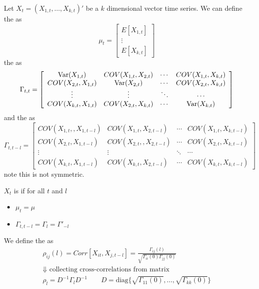 Let $X_t = (X_{1,t}, \ldots,X_{k,t})'$ be a $k$ dimensional vector time series.
We can define the  as
\begin{equation*}
    \mu_t = \left[\begin{array}{c}
        E[X_{1,t}]\\
        \vdots\\
        E[X_{k,t}]
    \end{array}\right]
\end{equation*}
the  as 
\begin{equation*}
    \Gamma_{t,t} = \left[\begin{array}{cccc}
        \operatorname{Var}(X_{1,t}) & COV(X_{1,t}, X_{2,t}) & \cdots & COV(X_{1,t}, X_{k,t})\\
        COV(X_{2,t}, X_{1,t}) & \operatorname{Var}(X_{2,t}) & \cdots & COV(X_{2,t}, X_{k,t})\\
        \vdots & \vdots & \ddots & \cdots\\
        COV(X_{k,t}, X_{1,t}) & COV(X_{2,t}, X_{k,t}) & \cdots & \operatorname{Var}(X_{k,t})
    \end{array}\right]
\end{equation*}
and the  as 
\begin{equation*}
    \Gamma_{t,t-l} = \left[\begin{array}{cccc}
        COV(X_{1,t},, X_{1,t-l}) & COV(X_{1,t}, X_{2,t-l}) & \cdots & COV(X_{1,t}, X_{k,t-l})\\
        COV(X_{2,t}, X_{1,t-l}) & COV(X_{2,t}, , X_{2,t-l}) & \cdots & COV(X_{2,t}, X_{k,t-l})\\
        \vdots & \vdots & \ddots & \cdots\\
        COV(X_{k,t}, X_{1,t-l}) & COV(X_{k,t}, X_{2,t-l}) & \cdots & COV(X_{k,t}, X_{k,t-l})
    \end{array}\right]
\end{equation*}
note this is not symmetric.
\begin{definition}
    $X_t$ is  if for all $t$ and $l$
    \begin{itemize}
        \item $\mu_t = \mu$
        \item $\Gamma_{t,t-l} = \Gamma_l = \Gamma'_{-l}$
    \end{itemize}
\end{definition}
We define the  as 
\begin{gather*}
    \rho_{ij}(l) = Corr[X_{it}, X_{j,t-l}] = \frac{\Gamma_{ij}(l)}{\sqrt{\Gamma_{ii}(0)\Gamma_{jj}(0)}}\\
    \Downarrow\text{ collecting cross-correlations from matrix}\\
    \rho_l = D^{-1}\Gamma_l D^{-1}\qquad D = \text{diag} \{\sqrt{\Gamma_{11}(0)},\ldots,\sqrt{\Gamma_{kk}(0)}\}
\end{gather*}
